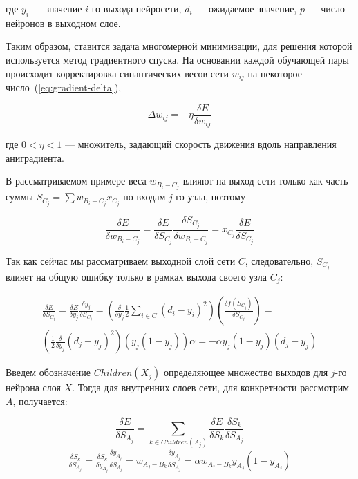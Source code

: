 \documentclass[a4paper,14pt]{extarticle} %
\begin{document}
\noindent где $y_i$ --- значение $i$-го выхода нейросети, $d_i$ --- ожидаемое значение, $p$ --- число нейронов в выходном слое.

Таким образом, ставится задача многомерной минимизации, для решения которой используется метод градиентного спуска. На основании каждой обучающей пары происходит корректировка синаптических весов сети $w_{ij}$ на некоторое число~(\ref{eq:gradient-delta}),

\begin{equation}\label{eq:gradient-delta}
\Delta w_{ij}=-\eta \frac{\delta E}{\delta w_{ij}}
\end{equation}

\noindent где $0<\eta < 1$ --- множитель, задающий скорость движения вдоль направления аниградиента.

В рассматриваемом примере веса $w_{B_i-C_j}$ влияют на выход сети только как часть суммы $S_{C_j} = \sum w_{B_i-C_j} x_{C_j}$ по входам $j$-го узла, поэтому

$$
\frac{\delta E}{\delta w_{B_i-C_j}} = \frac{\delta E}{\delta S_{C_j}} \frac{\delta S_{C_j}}{\delta w_{B_i-C_j}} = x_{C_j} \frac{\delta E}{\delta S_{C_j}}
$$

Так как сейчас мы рассматриваем выходной слой сети $C$, следовательно, $S_{C_j}$ влияет на общую ошибку только в рамках выхода своего узла $C_j$:

\begin{eqnarray}\label{eq:out-layer-error}
\frac{\delta E}{\delta S_{C_j}} = \frac{\delta E}{\delta y_j} \frac{\delta y_j}{\delta  S_{C_j}} = \left(\frac{\delta}{\delta y_j} \frac{1}{2} \sum\limits_{i \in C} (d_i-y_i)^2\right)\left(\frac{\delta f(S_{C_j})}{\delta S_{C_j}}\right) = \nonumber \\ \left(\frac{1}{2}\frac{\delta}{\delta y_j}(d_j-y_j)^2\right)\left(y_j(1-y_j)\right)\alpha = -\alpha y_j(1-y_j)(d_j-y_j)
\end{eqnarray}

Введем обозначение $Children(X_j)$ определяющее множество выходов для $j$-го нейрона слоя $X$. Тогда для внутренних слоев сети, для конкретности рассмотрим $A$, получается:

$$
\frac{\delta E}{\delta S_{A_j}} = \sum_{k \in Children(A_j)} \frac{\delta E}{\delta S_k} \frac{\delta S_k}{\delta S_{A_j}} 
$$
\begin{eqnarray}\label{eq:in-layer}
\frac{\delta S_k}{\delta S_{A_j}}=\frac{\delta S_k}{\delta y_{A_j}} \frac{\delta y_{A_j}}{\delta S_{A_j}}=w_{A_j-B_k}\frac{\delta y_{A_j}}{\delta S_{A_j}}=\alpha w_{A_j-B_k} y_{A_j}(1-y_{A_j})
\end{eqnarray}
\end{document}
